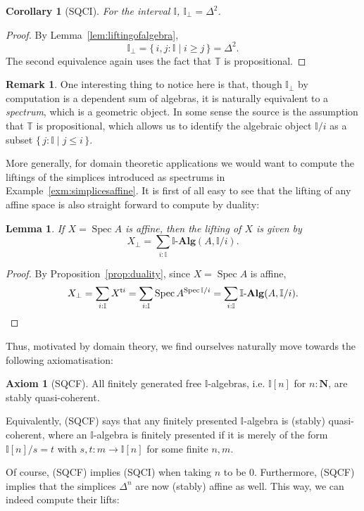 \documentclass[12pt]{amsart}
\newtheorem{lemma}[theorem]{Lemma}
\newtheorem{corollary}[theorem]{Corollary}
\theoremstyle{definition}
\newtheorem{remark}[theorem]{Remark}
\newtheorem*{axiom}{Axiom}
\newcommand{\mb}[1]{\mathbf{#1}}
\newcommand{\mbb}[1]{\mathbb{#1}}
\newcommand{\T}{\mbb T}
\newcommand{\I}{\mbb I}
\newcommand{\ms}[1]{\mathsf{#1}}
\newcommand{\alg}{\text{-}\mb{Alg}}
\newcommand{\scomp}[2]{\{\,#1\mid#2\,\}}
\newcommand{\N}{\mb N}
\newcommand{\prt}{_{\bot}}
\newcommand{\spec}{\operatorname{Spec}}
\begin{document}
\begin{corollary}[SQCI]
  For the interval $\I$, $\I\prt = \Delta^2$.
\end{corollary}
\begin{proof}
  By Lemma~\ref{lem:liftingofalgebra}, 
  \[ \I\prt = \scomp{i,j : \I}{i \ge j} = \Delta^2. \]
  The second equivalence again uses the fact that $\T$ is propositional.
\end{proof}

\begin{remark}
  One interesting thing to notice here is that, though $\I\prt$ by computation is a dependent sum of algebras, it is naturally equivalent to a \emph{spectrum}, which is a geometric object. In some sense the source is the assumption that $\T$ is propositional, which allows us to identify the algebraic object $\I/i$ as a subset $\scomp{j : \I}{j \le i}$.
\end{remark}


More generally, for domain theoretic applications we would want to compute the liftings of the simplices introduced as spectrums in Example~\ref{exm:simplicesaffine}. It is first of all easy to see that the lifting of any affine space is also straight forward to compute by duality:

\begin{lemma}\label{lem:liftofaffine}
  If $X = \spec A$ is affine, then the lifting of $X$ is given by
  \[ X\prt = \sum_{i:\I}\I\alg(A,\I/i). \]
\end{lemma}
\begin{proof}
  By Proposition~\ref{prop:duality}, since $X = \spec A$ is affine,
  \[ X\prt = \sum_{i:\I}X^{\ms ti} = \sum_{i:\I}\spec A^{\spec \I/i} = \sum_{i:\I}\I\alg(A,\I/i). \qedhere \]
\end{proof}

Thus, motivated by domain theory, we find ourselves naturally move towards the following axiomatisation:

\begin{axiom}[SQCF]
  All finitely generated free $\I$-algebras, i.e. $\I[n]$ for $n : \N$, are stably quasi-coherent.
\end{axiom}

Equivalently, (SQCF) says that any finitely presented $\I$-algebra is (stably) quasi-coherent, where an $\I$-algebra is finitely presented if it is merely of the form $\I[n]/s=t$ with $s,t : m \to \I[n]$ for some finite $n,m$.

Of course, (SQCF) implies (SQCI) when taking $n$ to be 0. Furthermore, (SQCF) implies that the simplices $\Delta^n$ are now (stably) affine as well. This way, we can indeed compute their lifts:
\end{document}
